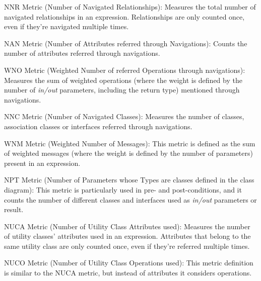 \begin{definition}\label{def:NNR}
NNR Metric (Number of Navigated Relationships): Measures the total number of navigated relationships in an expression. Relationships are only counted once, even if they're navigated multiple times.
\end{definition}

\begin{definition}\label{def:NAN}
NAN Metric (Number of Attributes referred through Navigations): Counts the number of attributes referred through navigations.
\end{definition}

\begin{definition}\label{def:WNO}
WNO Metric (Weighted Number of referred Operations through navigations): Measures the sum of weighted operations (where the weight is defined by the number of \textit{in/out} parameters,  including the return type) mentioned through navigations.
\end{definition}

\begin{definition}\label{def:NNC}
NNC Metric (Number of Navigated Classes): Measures the number of classes, association classes or interfaces referred through navigations.
\end{definition}

\begin{definition}\label{def:WNM}
WNM Metric (Weighted Number of Messages): This metric is defined as the sum of weighted messages (where the weight is defined by the number of parameters) present in an expression.
\end{definition}

\begin{definition}\label{def:NPT}
NPT Metric (Number of Parameters whose Types are classes defined in the class diagram): This metric is particularly used in pre- and post-conditions, and it counts the number of different classes and interfaces used as \textit{in/out} parameters or result.
\end{definition}

\begin{definition}\label{def:NUCA}
NUCA Metric (Number of Utility Class Attributes used): Measures the number of utility classes' attributes used in an expression. Attributes that belong to the same utility class are only counted once, even if they're referred multiple times.
\end{definition}

\begin{definition}\label{def:NUCO}
NUCO Metric (Number of Utility Class Operations used): This metric definition is similar to the NUCA metric, but instead of attributes it considers operations.
\end{definition}

